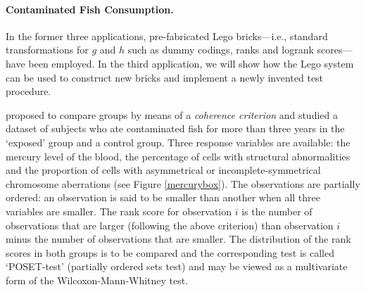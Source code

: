 \documentclass{article}
\begin{document}
\paragraph{Contaminated Fish Consumption.}

In the former three applications, pre-fabricated Lego bricks---i.e.,
standard transformations for $g$ and $h$ such as dummy codings, ranks
and logrank scores---have been employed.
In the third application, we will show how the Lego system can be used
to construct new bricks and implement a newly invented test procedure. 

\cite{Rosenbaum1994a} proposed to compare groups by means of a
\textit{coherence criterion} and studied a dataset of subjects 
who ate contaminated fish for more than three years in
the `exposed' group and a control group. Three response variables are
available: the mercury level of the blood, the percentage of cells with
structural abnormalities and the proportion of cells with asymmetrical or
incomplete-symmetrical chromosome aberrations (see Figure \ref{mercurybox}). 
The observations are partially
ordered: an observation is said to be smaller than another when all three variables
are smaller. The rank score for observation $i$ is the number of
observations that are larger (following the above criterion) 
than observation $i$ minus the number of
observations that are smaller. The
distribution of the rank scores in both groups is to be compared and
the corresponding test is called `POSET-test' (partially ordered
sets test) and may be viewed as a multivariate form of the
Wilcoxon-Mann-Whitney test.
\end{document}
